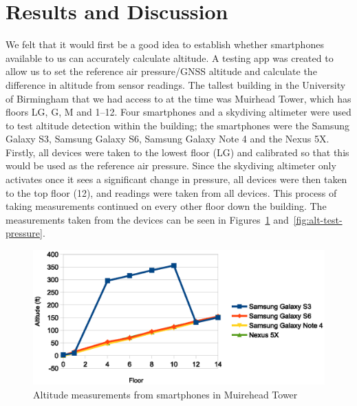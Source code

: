 \documentclass[11pt, a4paper, twocolumn]{article}
\begin{document}
\section{Results and Discussion}\label{sec:results-discussion} %

We felt that it would first be a good idea to establish whether smartphones available to us can accurately calculate altitude. A testing app was created to allow us to set the reference air pressure/GNSS altitude and calculate the difference in altitude from sensor readings.
The tallest building in the University of Birmingham that we had access to at the time was Muirhead Tower, which has floors LG, G, M and 1--12. Four smartphones and a skydiving altimeter were used to test altitude detection within the building; the smartphones were the Samsung Galaxy S3, Samsung Galaxy S6, Samsung Galaxy Note 4 and the Nexus 5X.
Firstly, all devices were taken to the lowest floor (LG) and calibrated so that this would be used as the reference air pressure. Since the skydiving altimeter only activates once it sees a significant change in pressure, all devices were then taken to the top floor (12), and readings were taken from all devices. This process of taking measurements continued on every other floor down the building.
The measurements taken from the devices can be seen in Figures~\ref{fig:alt-test-altitude} and~\ref{fig:alt-test-pressure}.

\begin{figure}[h]
    \centering
    \includegraphics{alt-test-altitude}
    \caption{Altitude measurements from smartphones in Muirehead Tower}\label{fig:alt-test-altitude}
\end{figure}
\end{document}

